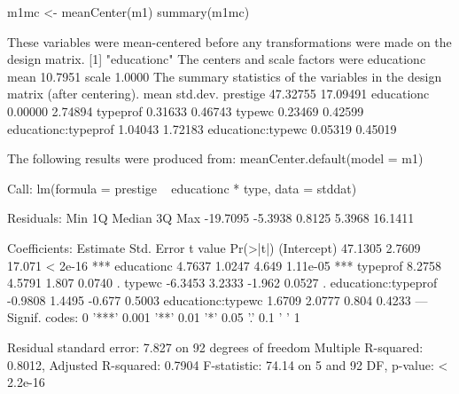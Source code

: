 \begin{Schunk}
\begin{Sinput}
 m1mc <- meanCenter(m1)
 summary(m1mc)
\end{Sinput}
\begin{Soutput}
These variables were mean-centered before any transformations were made on the design matrix.
[1] "educationc"
The centers and scale factors were 
      educationc
mean     10.7951
scale     1.0000
The summary statistics of the variables in the design matrix (after centering). 
                        mean std.dev.
prestige            47.32755 17.09491
educationc           0.00000  2.74894
typeprof             0.31633  0.46743
typewc               0.23469  0.42599
educationc:typeprof  1.04043  1.72183
educationc:typewc    0.05319  0.45019

The following results were produced from: 
meanCenter.default(model = m1)

Call:
lm(formula = prestige ~ educationc * type, data = stddat)

Residuals:
     Min       1Q   Median       3Q      Max 
-19.7095  -5.3938   0.8125   5.3968  16.1411 

Coefficients:
                    Estimate Std. Error t value Pr(>|t|)    
(Intercept)          47.1305     2.7609  17.071  < 2e-16 ***
educationc            4.7637     1.0247   4.649 1.11e-05 ***
typeprof              8.2758     4.5791   1.807   0.0740 .  
typewc               -6.3453     3.2333  -1.962   0.0527 .  
educationc:typeprof  -0.9808     1.4495  -0.677   0.5003    
educationc:typewc     1.6709     2.0777   0.804   0.4233    
---
Signif. codes:  0 '***' 0.001 '**' 0.01 '*' 0.05 '.' 0.1 ' ' 1

Residual standard error: 7.827 on 92 degrees of freedom
Multiple R-squared:  0.8012,	Adjusted R-squared:  0.7904 
F-statistic: 74.14 on 5 and 92 DF,  p-value: < 2.2e-16
\end{Soutput}
\end{Schunk}
